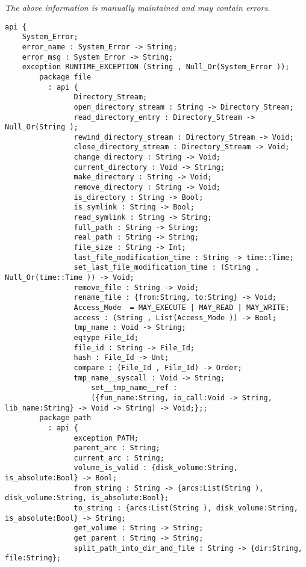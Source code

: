 \label{api:Winix}

{\tiny \it The above information is manually maintained and may contain errors.}
\begin{verbatim}
api {
    System_Error;
    error_name : System_Error -> String;
    error_msg : System_Error -> String;
    exception RUNTIME_EXCEPTION (String , Null_Or(System_Error ));
        package file
          : api {
                Directory_Stream;
                open_directory_stream : String -> Directory_Stream;
                read_directory_entry : Directory_Stream -> Null_Or(String );
                rewind_directory_stream : Directory_Stream -> Void;
                close_directory_stream : Directory_Stream -> Void;
                change_directory : String -> Void;
                current_directory : Void -> String;
                make_directory : String -> Void;
                remove_directory : String -> Void;
                is_directory : String -> Bool;
                is_symlink : String -> Bool;
                read_symlink : String -> String;
                full_path : String -> String;
                real_path : String -> String;
                file_size : String -> Int;
                last_file_modification_time : String -> time::Time;
                set_last_file_modification_time : (String , Null_Or(time::Time )) -> Void;
                remove_file : String -> Void;
                rename_file : {from:String, to:String} -> Void;
                Access_Mode  = MAY_EXECUTE | MAY_READ | MAY_WRITE;
                access : (String , List(Access_Mode )) -> Bool;
                tmp_name : Void -> String;
                eqtype File_Id;
                file_id : String -> File_Id;
                hash : File_Id -> Unt;
                compare : (File_Id , File_Id) -> Order;
                tmp_name__syscall : Void -> String;
                    set__tmp_name__ref :
                    ({fun_name:String, io_call:Void -> String, lib_name:String} -> Void -> String) -> Void;};;
        package path
          : api {
                exception PATH;
                parent_arc : String;
                current_arc : String;
                volume_is_valid : {disk_volume:String, is_absolute:Bool} -> Bool;
                from_string : String -> {arcs:List(String ), disk_volume:String, is_absolute:Bool};
                to_string : {arcs:List(String ), disk_volume:String, is_absolute:Bool} -> String;
                get_volume : String -> String;
                get_parent : String -> String;
                split_path_into_dir_and_file : String -> {dir:String, file:String};

\end{verbatim}
